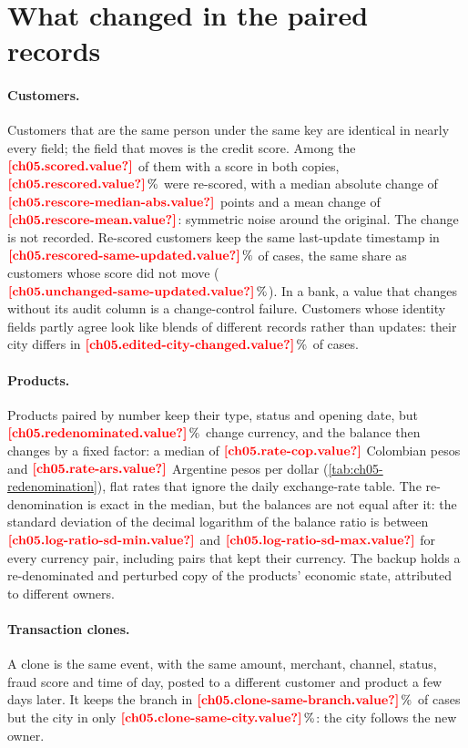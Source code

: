 \section{What changed in the paired records}\label{sec:rl-changes}

\paragraph{Customers.} Customers that are the same person under the same key are identical in nearly every field;
the field that moves is the credit score. Among the $\est{ch05.scored}{value}$ of them with a score in both copies, $\est{ch05.rescored}{value}\,\%$
were re-scored, with a median absolute change of $\est{ch05.rescore-median-abs}{value}$ points and a mean change of
$\est{ch05.rescore-mean}{value}$: symmetric noise around the original. The change is not recorded. Re-scored
customers keep the same last-update timestamp in $\est{ch05.rescored-same-updated}{value}\,\%$ of cases, the same share
as customers whose score did not move ($\est{ch05.unchanged-same-updated}{value}\,\%$). In a bank, a value that changes
without its audit column is a change-control failure. Customers whose identity fields partly agree look like blends of
different records rather than updates: their city differs in $\est{ch05.edited-city-changed}{value}\,\%$ of cases.

\paragraph{Products.} Products paired by number keep their type, status and opening date, but
$\est{ch05.redenominated}{value}\,\%$ change currency, and the balance then changes by a fixed factor: a median of
$\est{ch05.rate-cop}{value}$ Colombian pesos and $\est{ch05.rate-ars}{value}$ Argentine pesos per dollar
(\cref{tab:ch05-redenomination}), flat rates that ignore the daily exchange-rate table. The re-denomination is exact in
the median, but the balances are not equal after it: the standard deviation of the decimal logarithm of the balance
ratio is between $\est{ch05.log-ratio-sd-min}{value}$ and $\est{ch05.log-ratio-sd-max}{value}$ for every currency
pair, including pairs that kept their currency. The backup holds a re-denominated and perturbed copy of the products'
economic state, attributed to different owners.



\paragraph{Transaction clones.} A clone is the same event, with the same amount, merchant, channel, status, fraud score
and time of day, posted to a different customer and product a few days later. It keeps the branch in
$\est{ch05.clone-same-branch}{value}\,\%$ of cases but the city in only $\est{ch05.clone-same-city}{value}\,\%$: the
city follows the new owner.

